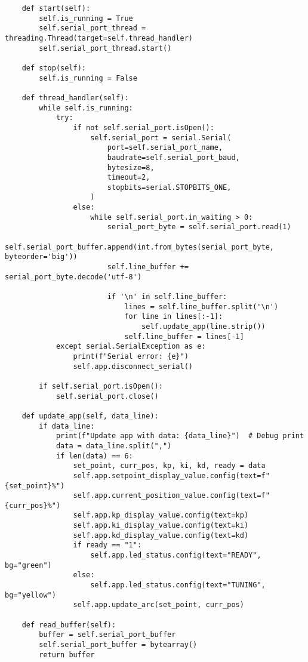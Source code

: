 \documentclass{article}
\begin{document}
\begin{verbatim}
    def start(self):
        self.is_running = True
        self.serial_port_thread = threading.Thread(target=self.thread_handler)
        self.serial_port_thread.start()

    def stop(self):
        self.is_running = False

    def thread_handler(self):
        while self.is_running:
            try:
                if not self.serial_port.isOpen():
                    self.serial_port = serial.Serial(
                        port=self.serial_port_name,
                        baudrate=self.serial_port_baud,
                        bytesize=8,
                        timeout=2,
                        stopbits=serial.STOPBITS_ONE,
                    )
                else:
                    while self.serial_port.in_waiting > 0:
                        serial_port_byte = self.serial_port.read(1)
                        self.serial_port_buffer.append(int.from_bytes(serial_port_byte, byteorder='big'))
                        self.line_buffer += serial_port_byte.decode('utf-8')

                        if '\n' in self.line_buffer:
                            lines = self.line_buffer.split('\n')
                            for line in lines[:-1]:
                                self.update_app(line.strip())
                            self.line_buffer = lines[-1]
            except serial.SerialException as e:
                print(f"Serial error: {e}")
                self.app.disconnect_serial()

        if self.serial_port.isOpen():
            self.serial_port.close()

    def update_app(self, data_line):
        if data_line:
            print(f"Update app with data: {data_line}")  # Debug print
            data = data_line.split(",")
            if len(data) == 6:
                set_point, curr_pos, kp, ki, kd, ready = data
                self.app.setpoint_display_value.config(text=f"{set_point}%")
                self.app.current_position_value.config(text=f"{curr_pos}%")
                self.app.kp_display_value.config(text=kp)
                self.app.ki_display_value.config(text=ki)
                self.app.kd_display_value.config(text=kd)
                if ready == "1":
                    self.app.led_status.config(text="READY", bg="green")
                else:
                    self.app.led_status.config(text="TUNING", bg="yellow")
                self.app.update_arc(set_point, curr_pos)

    def read_buffer(self):
        buffer = self.serial_port_buffer
        self.serial_port_buffer = bytearray()
        return buffer


\end{verbatim}
\end{document}
